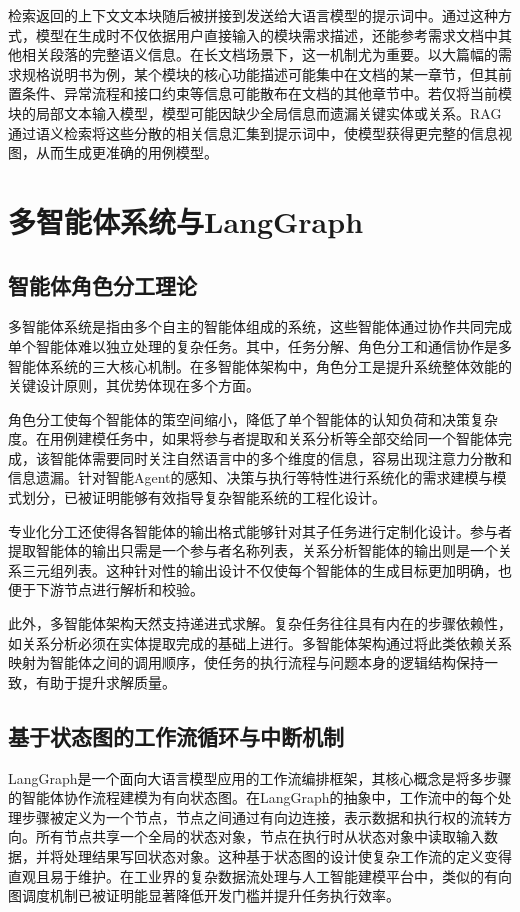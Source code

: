 检索返回的上下文文本块随后被拼接到发送给大语言模型的提示词中。通过这种方式，模型在生成时不仅依据用户直接输入的模块需求描述，还能参考需求文档中其他相关段落的完整语义信息。在长文档场景下，这一机制尤为重要。以大篇幅的需求规格说明书为例，某个模块的核心功能描述可能集中在文档的某一章节，但其前置条件、异常流程和接口约束等信息可能散布在文档的其他章节中。若仅将当前模块的局部文本输入模型，模型可能因缺少全局信息而遗漏关键实体或关系。RAG通过语义检索将这些分散的相关信息汇集到提示词中，使模型获得更完整的信息视图，从而生成更准确的用例模型。

\section{多智能体系统与LangGraph}

\subsection{智能体角色分工理论}

多智能体系统是指由多个自主的智能体组成的系统，这些智能体通过协作共同完成单个智能体难以独立处理的复杂任务。其中，任务分解、角色分工和通信协作是多智能体系统的三大核心机制。在多智能体架构中，角色分工是提升系统整体效能的关键设计原则，其优势体现在多个方面。

角色分工使每个智能体的策空间缩小，降低了单个智能体的认知负荷和决策复杂度。在用例建模任务中，如果将参与者提取和关系分析等全部交给同一个智能体完成，该智能体需要同时关注自然语言中的多个维度的信息，容易出现注意力分散和信息遗漏。针对智能Agent的感知、决策与执行等特性进行系统化的需求建模与模式划分，已被证明能够有效指导复杂智能系统的工程化设计\cite{xiao2026problemframes}。

专业化分工还使得各智能体的输出格式能够针对其子任务进行定制化设计。参与者提取智能体的输出只需是一个参与者名称列表，关系分析智能体的输出则是一个关系三元组列表。这种针对性的输出设计不仅使每个智能体的生成目标更加明确，也便于下游节点进行解析和校验。

此外，多智能体架构天然支持递进式求解。复杂任务往往具有内在的步骤依赖性，如关系分析必须在实体提取完成的基础上进行。多智能体架构通过将此类依赖关系映射为智能体之间的调用顺序，使任务的执行流程与问题本身的逻辑结构保持一致，有助于提升求解质量。

\subsection{基于状态图的工作流循环与中断机制}

LangGraph是一个面向大语言模型应用的工作流编排框架，其核心概念是将多步骤的智能体协作流程建模为有向状态图。在LangGraph的抽象中，工作流中的每个处理步骤被定义为一个节点，节点之间通过有向边连接，表示数据和执行权的流转方向。所有节点共享一个全局的状态对象，节点在执行时从状态对象中读取输入数据，并将处理结果写回状态对象。这种基于状态图的设计使复杂工作流的定义变得直观且易于维护。在工业界的复杂数据流处理与人工智能建模平台中，类似的有向图调度机制已被证明能显著降低开发门槛并提升任务执行效率\cite{xu2025cloudnative}。

